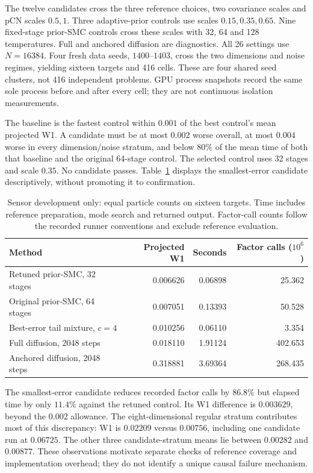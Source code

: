 The twelve candidates cross the three reference choices, two covariance scales and pCN scales $0.5,1$. Three adaptive-prior controls use scales $0.15,0.35,0.65$. Nine fixed-stage prior-SMC controls cross these scales with 32, 64 and 128 temperatures. Full and anchored diffusion are diagnostics. All 26 settings use $N=16384$. Four fresh data seeds, $1400$--$1403$, cross the two dimensions and noise regimes, yielding sixteen targets and 416 cells. These are four shared seed clusters, not 416 independent problems. GPU process snapshots record the same sole process before and after every cell; they are not continuous isolation measurements.

The baseline is the fastest control within $0.001$ of the best control's mean projected W1. A candidate must be at most $0.002$ worse overall, at most $0.004$ worse in every dimension/noise stratum, and below $80\%$ of the mean time of both that baseline and the original 64-stage control. The selected control uses 32 stages and scale $0.35$. No candidate passes. Table~\ref{tab:static-bridge-development} displays the smallest-error candidate descriptively, without promoting it to confirmation.

\begin{table}[h]
\centering\small
\caption{Sensor development only: equal particle counts on sixteen targets. Time includes reference preparation, mode search and returned output. Factor-call counts follow the recorded runner conventions and exclude reference evaluation.}
\label{tab:static-bridge-development}
\begin{tabular}{lrrr}
\toprule
Method & Projected W1 & Seconds & Factor calls ($10^6$)\\
\midrule
Retuned prior-SMC, 32 stages & 0.006626 & 0.06898 & 25.362\\
Original prior-SMC, 64 stages & 0.007051 & 0.13393 & 50.528\\
Best-error tail mixture, $c=4$ & 0.010256 & 0.06110 & 3.354\\
Full diffusion, 2048 steps & 0.018110 & 1.91124 & 402.653\\
Anchored diffusion, 2048 steps & 0.318881 & 3.69364 & 268.435\\
\bottomrule
\end{tabular}
\end{table}

The smallest-error candidate reduces recorded factor calls by $86.8\%$ but elapsed time by only $11.4\%$ against the retuned control. Its W1 difference is $0.003629$, beyond the $0.002$ allowance. The eight-dimensional regular stratum contributes most of this discrepancy: W1 is $0.02209$ versus $0.00756$, including one candidate run at $0.06725$. The other three candidate-stratum means lie between $0.00282$ and $0.00877$. These observations motivate separate checks of reference coverage and implementation overhead; they do not identify a unique causal failure mechanism.


